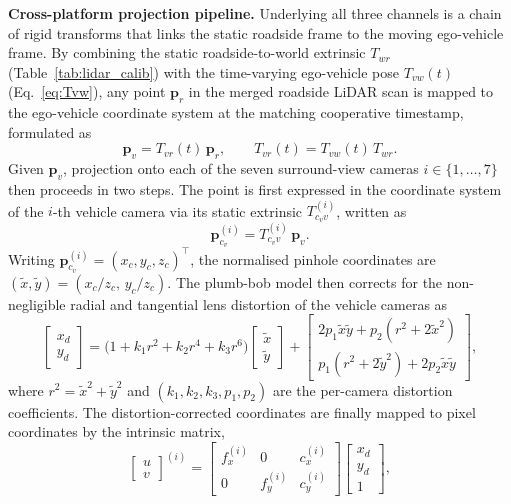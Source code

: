 \textbf{Cross-platform projection pipeline.}
Underlying all three channels is a chain of rigid transforms
that links the static roadside frame to the moving
ego-vehicle frame. By combining the static roadside-to-world
extrinsic $T_{wr}$ (Table~\ref{tab:lidar_calib}) with the
time-varying ego-vehicle pose $T_{vw}(t)$
(Eq.~\eqref{eq:Tvw}), any point $\mathbf{p}_r$ in the merged
roadside LiDAR scan is mapped to the ego-vehicle coordinate
system at the matching cooperative timestamp, formulated as
%
\begin{equation}
  \label{eq:chain}
  \mathbf{p}_v = T_{vr}(t)\,\mathbf{p}_r,
  \qquad T_{vr}(t) = T_{vw}(t)\,T_{wr}.
\end{equation}
%
Given $\mathbf{p}_v$, projection onto each of the seven
surround-view cameras $i\in\{1,\ldots,7\}$ then proceeds in
two steps. The point is first expressed in the coordinate
system of the $i$-th vehicle camera via its static extrinsic
$T_{c_v v}^{(i)}$, written as
%
\begin{equation}
  \label{eq:cam}
  \mathbf{p}_{c_v}^{(i)} = T_{c_v v}^{(i)}\,\mathbf{p}_v.
\end{equation}
%
Writing $\mathbf{p}_{c_v}^{(i)} = (x_c, y_c, z_c)^\top$, the
normalised pinhole coordinates are
$(\tilde{x},\tilde{y})=(x_c/z_c,\,y_c/z_c)$. The plumb-bob
model then corrects for the non-negligible radial and
tangential lens distortion of the vehicle cameras as
%
\begin{equation}
  \label{eq:distort}
  \begin{bmatrix}x_d\\y_d\end{bmatrix}
  = \bigl(1+k_1r^2+k_2r^4+k_3r^6\bigr)
    \begin{bmatrix}\tilde{x}\\\tilde{y}\end{bmatrix}
  + \begin{bmatrix}
      2p_1\tilde{x}\tilde{y}+p_2(r^2+2\tilde{x}^2)\\
      p_1(r^2+2\tilde{y}^2)+2p_2\tilde{x}\tilde{y}
    \end{bmatrix},
\end{equation}
%
where $r^2=\tilde{x}^2+\tilde{y}^2$ and
$(k_1, k_2, k_3, p_1, p_2)$ are the per-camera distortion
coefficients. The distortion-corrected coordinates are
finally mapped to pixel coordinates by the intrinsic matrix,
%
\begin{equation}
  \label{eq:pixel}
  \begin{bmatrix}u\\v\end{bmatrix}^{\!(i)}
  = \begin{bmatrix}f_x^{(i)}&0&c_x^{(i)}\\0&f_y^{(i)}&c_y^{(i)}\end{bmatrix}
    \begin{bmatrix}x_d\\y_d\\1\end{bmatrix},
\end{equation}
